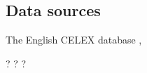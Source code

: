 \subsection{Data sources}

The English CELEX database \citep{CELEX},

\citet{Aronoff1976}

\citet{Harley2009}

\citet{Taft1975} ?
\citet{Taft1981} ?
\citet{Taft2004a} ?

\citet{Halle1962}
